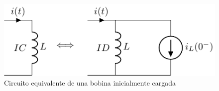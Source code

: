 \begin{figure}[H]
  \centering \includegraphics{../figs/condiciones_iniciales_L.pdf}
  \caption{Circuito equivalente de una bobina inicialmente cargada}
  \label{fig:condiciones_iniciales_L}
\end{figure}
	
	
